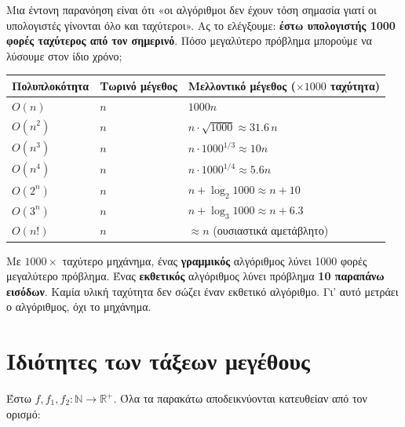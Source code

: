\documentclass[11pt,a4paper]{article}
\begin{document}
Μια έντονη παρανόηση είναι ότι «οι αλγόριθμοι δεν έχουν τόση σημασία γιατί οι
υπολογιστές γίνονται όλο και ταχύτεροι». Ας το ελέγξουμε: \textbf{έστω υπολογιστής
1000 φορές ταχύτερος από τον σημερινό}. Πόσο μεγαλύτερο πρόβλημα μπορούμε να
λύσουμε στον ίδιο χρόνο;

\begin{center}
\begin{tabular}{@{}l l l@{}}
\toprule
Πολυπλοκότητα & Τωρινό μέγεθος & Μελλοντικό μέγεθος ($\times 1000$ ταχύτητα) \\
\midrule
$O(n)$   & $n$ & $1000n$ \\
$O(n^2)$ & $n$ & $n \cdot \sqrt{1000} \approx 31.6\,n$ \\
$O(n^3)$ & $n$ & $n \cdot 1000^{1/3} \approx 10n$ \\
$O(n^4)$ & $n$ & $n \cdot 1000^{1/4} \approx 5.6n$ \\
$O(2^n)$ & $n$ & $n + \log_2 1000 \approx n + 10$ \\
$O(3^n)$ & $n$ & $n + \log_3 1000 \approx n + 6.3$ \\
$O(n!)$  & $n$ & $\approx n$ (ουσιαστικά αμετάβλητο) \\
\bottomrule
\end{tabular}
\end{center}

\begin{warningbox}
Με $1000\times$ ταχύτερο μηχάνημα, ένας \textbf{γραμμικός} αλγόριθμος λύνει 1000
φορές μεγαλύτερο πρόβλημα. Ένας \textbf{εκθετικός} αλγόριθμος λύνει πρόβλημα
\textbf{10 παραπάνω εισόδων}. Καμία υλική ταχύτητα δεν σώζει έναν εκθετικό
αλγόριθμο. Γι' αυτό μετράει ο αλγόριθμος, όχι το μηχάνημα.
\end{warningbox}

\section{Ιδιότητες των τάξεων μεγέθους}

Έστω $f, f_1, f_2 : \mathbb{N} \to \mathbb{R}^+$. Όλα τα παρακάτω αποδεικνύονται
κατευθείαν από τον ορισμό:
\end{document}

